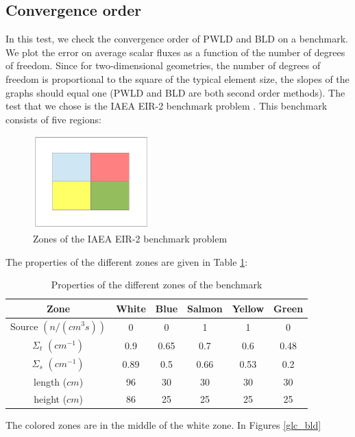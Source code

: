 \subsection{Convergence order}
In this test, we check the convergence order of PWLD and BLD on a benchmark.
We plot the error on average scalar fluxes as a function of the number of 
degrees of freedom. Since for two-dimensional geometries, the number of
degrees of freedom is
proportional to the square of the typical element size, the slopes of the 
graphs should equal one (PWLD and BLD are both second order methods). The test
that we chose is the IAEA EIR-2 benchmark problem \cite{Khalil1985}. This 
benchmark consists of five regions:
\begin{figure}[H]
  \centering
  \includegraphics[width=0.4\textwidth]{./Janus/benchmark}
  \caption{Zones of the IAEA EIR-2 benchmark problem}
\end{figure}
The properties of the different zones are given in Table \ref{tabl_1}:
\begin{table}[H]
  \begin{center}
    \caption{Properties of the different zones of the benchmark}
    \begin{tabular}{|c|c|c|c|c|c|}
      \hline
    Zone & White & Blue & Salmon & Yellow & Green \\
      \hline
      Source $(n/(cm^3s))$ & 0    & 0    & 1    & 1    & 0 \\
    $\Sigma_t$ $(cm^{-1})$ & 0.9  & 0.65 & 0.7  & 0.6  & 0.48 \\
    $\Sigma_s$ $(cm^{-1})$ & 0.89 & 0.5  & 0.66 & 0.53 & 0.2 \\
             length ($cm$) & 96   & 30   & 30   & 30   & 30 \\
             height ($cm$) & 86   & 25   & 25   & 25   & 25 \\
      \hline
    \end{tabular}
    \label{tabl_1}
  \end{center}
\end{table}
The colored zones are in the middle of the white zone. In Figures \ref{glc_bld} 
